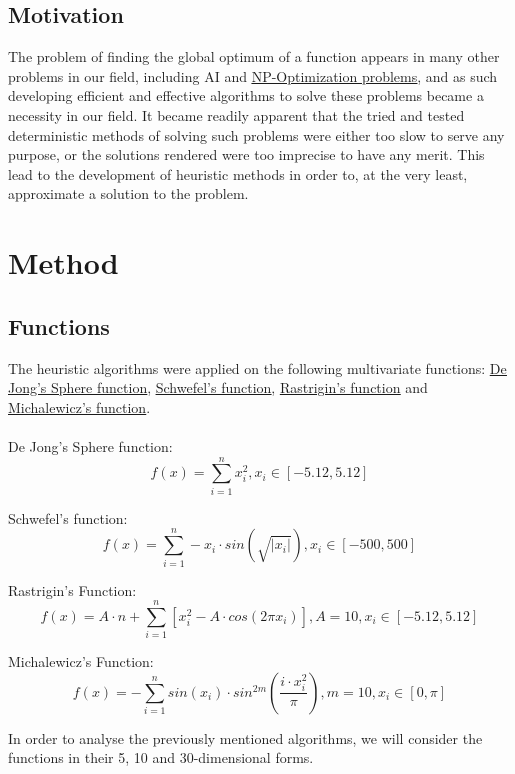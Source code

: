 \documentclass{article}
\begin{document}
\subsection{Motivation}
The problem of finding the global optimum of a function appears in many other problems in our field, including AI and \underline{\href{https://en.wikipedia.org/wiki/Combinatorial_optimization}{NP-Optimization problems}}, and as such developing efficient and effective algorithms to solve these problems became a necessity in our field. It became readily apparent that the tried and tested deterministic methods of solving such problems were either too slow to serve any purpose, or the solutions rendered were too imprecise to have any merit. This lead to the development of heuristic methods in order to, at the very least, approximate a solution to the problem.

\section{Method}
\subsection{Functions}
The heuristic algorithms were applied on the following multivariate functions: \underline{\href{http://www.geatbx.com/docu/fcnindex-01.html\#P89_3085}{De Jong's Sphere function}}, \underline{\href{http://www.geatbx.com/docu/fcnindex-01.html\#P150_6749}{Schwefel's function}}, \underline{\href{http://www.geatbx.com/docu/fcnindex-01.html\#P140_6155}{Rastrigin's function}} and \\\underline{\href{http://www.geatbx.com/docu/fcnindex-01.html\#P204_10395}{Michalewicz's function}}\cite{Functions}.
\\ \\
De Jong's Sphere function:
$$ f(x) = \sum_{i = 1}^n x_i^2, 
x_i \in \left[ -5.12, 5.12 \right] $$

Schwefel's function:
$$ f(x) = \sum_{i = 1}^n -x_i \cdot sin\left(\sqrt{\left|x_i\right|}\right), 
x_i \in \left[ -500, 500 \right] $$

Rastrigin's Function:
$$ f(x) = A \cdot n + \sum_{i=1}^n \left[ x_i^2 - A \cdot cos(2 \pi x_i) \right],
A = 10, x_i \in \left[ -5.12, 5.12 \right]$$

Michalewicz's Function:
$$ f(x) = - \sum_{i=1}^n sin(x_i) \cdot sin^{2m}\left(\frac{i \cdot x_i^2}{\pi}\right),
m = 10, x_i \in \left[ 0, \pi \right]$$

In order to analyse the previously mentioned algorithms, we will consider the functions in their 5, 10 and 30-dimensional forms.
\end{document}
